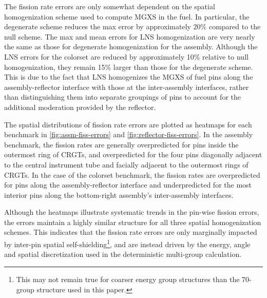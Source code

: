 The fission rate errors are only somewhat dependent on the spatial homogenization scheme used to compute MGXS in the fuel. In particular, the degenerate scheme reduces the max error by approximately 20\% compared to the null scheme. The max and mean errors for LNS homogenization are very nearly the same as those for degenerate homogenization for the assembly. Although the LNS errors for the colorset are reduced by approximately 10\% relative to null homogenization, they remain 15\% larger than those for the degenerate scheme. This is due to the fact that LNS homogenizes the MGXS of fuel pins along the assembly-reflector interface with those at the inter-assembly interfaces, rather than distinguishing them into separate groupings of pins to account for the additional moderation provided by the reflector.

The spatial distributions of fission rate errors are plotted as heatmaps for each benchmark in \autoref{fig:assm-fiss-errors} and \autoref{fig:reflector-fiss-errors}. In the assembly benchmark, the fission rates are generally overpredicted for pins inside the outermost ring of CRGTs, and overpredicted for the four pins diagonally adjacent to the central instrument tube and facially adjacent to the outermost rings of CRGTs. In the case of the colorset benchmark, the fission rates are overpredicted for pins along the assembly-reflector interface and underpredicted for the most interior pins along the bottom-right assembly's inter-assembly interfaces.

Although the heatmaps illustrate systematic trends in the pin-wise fission errors, the errors maintain a highly similar structure for all three spatial homogenization schemes. This indicates that the fission rate errors are only marginally impacted by inter-pin spatial self-shielding\footnote{This may not remain true for coarser energy group structures than the 70-group structure used in this paper.}, and are instead driven by the energy, angle and spatial discretization used in the deterministic multi-group calculation.


\clearpage

